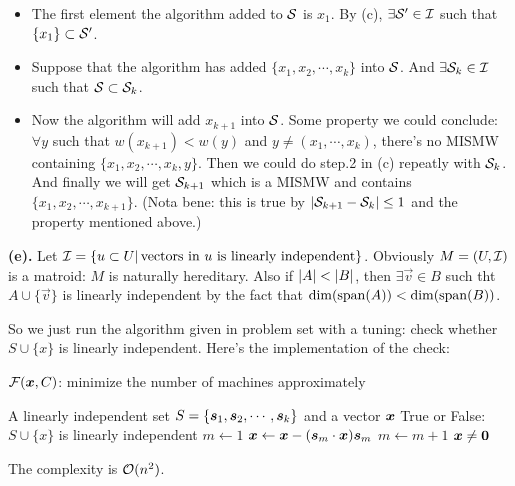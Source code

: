 \documentclass{article}
\begin{document}
\begin{itemize}
	\item 
		The first element the algorithm added to $\+S$ is $x_1$. By (c), $\exists \+S'\in\+I$ such that $\{x_1\}\subset\+S'$.
	\item Suppose that the algorithm has added $\{x_1,x_2,\cdots,x_k\}$ into $\+S$. And $\exists \+S_k\in\+I$ such that $\+S\subset\+S_k$.
	\item  Now the algorithm will add  $x_{k+1}$ into $\+S$. Some property we could conclude:  $\forall y$ such that $w(x_{k+1})<w(y)$ and $y \ne (x_1,\cdots,x_k)$, there's no MISMW containing $\{x_1,x_2,\cdots,x_k,y\}$.
		Then we could do step.2 in (c) repeatly with $\+S_k$. And finally we will get $\+S_{k+1}$ which is a MISMW and contains  $\{x_1,x_2,\cdots,x_{k+1}\}$. (Nota bene: this is true by $\abs{\+S_{k+1}-\+S_k} \le 1$ and the property mentioned above.)
\end{itemize}
\textbf{(e).}
Let $\+I=\qty{u\subset U|\,\text{vectors in $u$ is linearly independent}}$. Obviously $M=(U,\+I)$ is a matroid: $M$ is naturally hereditary. Also if $\abs{A}<\abs{B}$, then $\exists \vec{v}\in B$ such tht $A\cup\{\vec{v}\}$ is linearly independent by the fact that $\dim(\-{span}(A))<\dim(\-{span}(B))$.

So we just run the algorithm given in problem set with a tuning: check whether $S\cup\{x\}$ is linearly independent. Here's the implementation of the check:
\\
\begin{algorithm}[htbp]
	\caption{$\+F(\*x,C)$: minimize the number of machines approximately}
	\label{li}
	\begin{algorithmic}[1]
		\renewcommand{\algorithmicrequire}{\textbf{Input:}}
		\renewcommand{\algorithmicensure}{\textbf{Output:}}
		\renewcommand{\algorithmiccomment}[1]{\hfill\textit{\textcolor{blue}{\##1}}}
		\REQUIRE A linearly independent set $S=\{\*s_1,\*s_2,\cdots,\*s_k\}$ and a vector  $\*x$
		\ENSURE True or False: $S\cup\{x\}$ is linearly independent
		\STATE  $m\gets 1$
		\STATE $\*x\gets\*x-(\*s_m\cdot\*x)\*s_m$
		\STATE $m\gets m+1$
		\ENDWHILE
		\RETURN $\*x\ne \*0$
	\end{algorithmic}
\end{algorithm}
The complexity is $\+O(n^2)$.

\newpage
\end{document}
